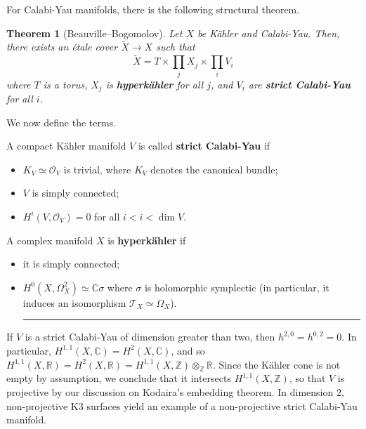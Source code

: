 \documentclass[11pt]{amsart}
\newcommand{\cO}{\mathcal{O}}
\newcommand{\cT}{\mathcal{T}}
\newcommand{\tbf}[1]{\textbf{#1}}
\newcommand{\Z}{\mathbb Z}
\newcommand{\R}{\mathbb R}
\newcommand{\C}{\mathbb C}
\newif\ifqedbarused
\newcommand{\qedbar}{%
  \unskip\nobreak\hfill %
  \hspace{1em} %
  \rule{3em}{0.4pt} %
}
\newcommand{\qedbarhere}{%
  \qedbar%
  \global\qedbarusedtrue%
}
\newtheorem{theorem}{Theorem}[subsection]
\theoremstyle{definition}
\numberwithin{equation}{section}
\begin{document}
For Calabi-Yau manifolds, there is the following structural theorem.
\begin{theorem}[Beauville--Bogomolov]
	Let $X$ be Kähler and Calabi-Yau. Then, there exists an étale cover $\tilde X\to X$ such that 
	\[
	\tilde X=T\times \prod_jX_j\times \prod_i V_i
	\]
	where $T$ is a torus, $X_j$ is \tbf{hyperkähler} for all $j$, and $V_i$ are \tbf{strict Calabi-Yau} for all $i$. 
\end{theorem}
We now define the terms.
\begin{definition}
	A compact Kähler manifold $V$ is called \tbf{strict Calabi-Yau} if
	\begin{itemize}
		\item $K_V\simeq \cO_V$ is trivial, where $K_V$ denotes the canonical bundle;
		\item $V$ is simply connected;
		\item $H^i(V,\cO_V)=0$ for all $i<i<\dim V$.
	\end{itemize}
	A complex manifold $X$ is \tbf{hyperkähler} if
	\begin{itemize}
		\item it is simply connected;
		\item $H^0(X,\Omega_X^2)\simeq \C\sigma$ where $\sigma$ is holomorphic symplectic (in particular, it induces an isomorphism $\cT_X\simeq \Omega_X$).\qedbarhere
	\end{itemize}
\end{definition}
\begin{remark}
	If $V$ is a strict Calabi-Yau of dimension greater than two, then $h^{2,0}=h^{0,2}=0$. In particular, $H^{1,1}(X,\C)=H^2(X,\C)$, and so $H^{1,1}(X,\R)=H^{2}(X,\R)=H^{1,1}(X,\Z)\otimes_\Z\R$. Since the Kähler cone is not empty by assumption, we conclude that it intersects $H^{1,1}(X,\Z)$, so that $V$ is projective by our discussion on Kodaira's embedding theorem. In dimension $2$, non-projective K3 surfaces yield an example of a non-projective strict Calabi-Yau manifold.
\end{remark}
\printbibliography
\end{document}
